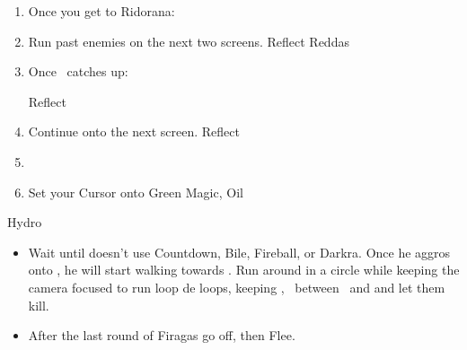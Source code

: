 \begin{enumerate}
	\item Once you get to Ridorana:
	\item Run past enemies on the next two screens.
	\ashef Reflect Reddas
	\item Once \ashe\ catches up:
	\begin{itemize}
		\penelof \fira \ashe
		\ashef Reflect \ashe
	\end{itemize}
	\item Continue onto the next screen.
	\penelof Reflect \penelo
	\decoy{\ashe}{\vaan}
	\item \castprotect{\vaan}{\vaan}
	\item Set your Cursor onto Green Magic, Oil
\end{enumerate}
\begin{menu}
\end{menu}
\begin{equip}
\begin{itemize}
\optimize{\vaan, \penelo, \ashe}
\end{itemize}
\end{equip}
\begin{battle}{Hydro}
	\begin{itemize}
	\vaanf Run Close, then once \vaan gets targeted:
	\girlsin
	
\begin{gambit}
	\begin{itemize}
		\ashegambit{Firaga}
		\penelogambit{Firaga}
	\end{itemize}
\end{gambit}
		      \penelof Oil the party
		      \item Wait until  doesn't use Countdown, Bile, Fireball, or Darkra.
		      \vaanf Once he aggros onto \vaan, he will start walking towards \vaan. Run around in a circle while keeping the camera focused to run loop de loops, keeping \ashe, \penelo\ between \vaan\ and  and let them kill.
		      \item After the last round of Firagas go off, then \GirlsGambitOff Flee.
	\end{itemize}
\end{battle}